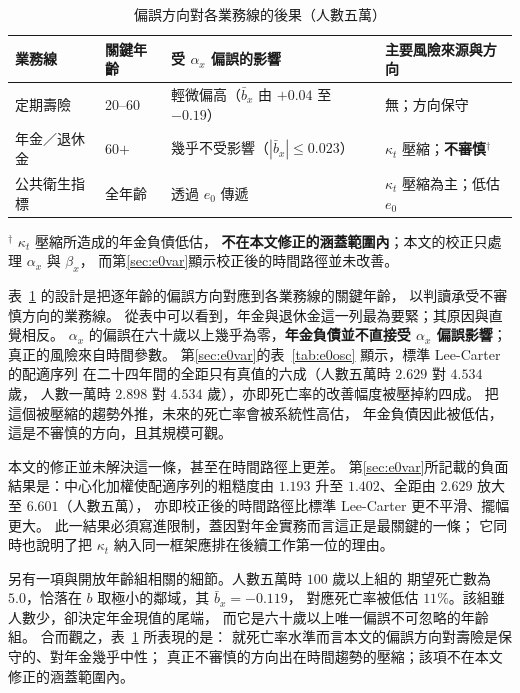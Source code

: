 \documentclass[UTF8, fontset=macnew, a4paper, 12pt]{ctexart}
\begin{document}
\begin{table}[H]
\centering
\caption{偏誤方向對各業務線的後果（人數五萬）}
\small
\begin{tabular}{llll}
\toprule
業務線 & 關鍵年齡 & 受 $\alpha_x$ 偏誤的影響 & 主要風險來源與方向\\
\midrule
定期壽險     & 20--60 & 輕微偏高（$\bar b_x$ 由 $+0.04$ 至 $-0.19$） & 無；方向保守\\
年金／退休金 & 60$+$  & 幾乎不受影響（$|\bar b_x|\le0.023$） & $\kappa_t$ 壓縮；\textbf{不審慎}$^{\dagger}$\\
公共衛生指標 & 全年齡 & 透過 $e_0$ 傳遞 & $\kappa_t$ 壓縮為主；低估 $e_0$\\
\bottomrule
\end{tabular}
\vspace{3pt}
{\footnotesize $^{\dagger}$ $\kappa_t$ 壓縮所造成的年金負債低估，
\textbf{不在本文修正的涵蓋範圍內}；本文的校正只處理 $\alpha_x$ 與 $\beta_x$，
而第\ref{sec:e0var}顯示校正後的時間路徑並未改善。}
\label{tab:risk}
\end{table}

表~\ref{tab:risk} 的設計是把逐年齡的偏誤方向對應到各業務線的關鍵年齡，
以判讀承受不審慎方向的業務線。
從表中可以看到，年金與退休金這一列最為要緊；其原因與直覺相反。
$\alpha_x$ 的偏誤在六十歲以上幾乎為零，\textbf{年金負債並不直接受
$\alpha_x$ 偏誤影響}；真正的風險來自時間參數。
第\ref{sec:e0var}的表~\ref{tab:e0osc} 顯示，標準 Lee-Carter 的配適序列
在二十四年間的全距只有真值的六成（人數五萬時 $2.629$ 對 $4.534$ 歲，
人數一萬時 $2.898$ 對 $4.534$ 歲），亦即死亡率的改善幅度被壓掉約四成。
把這個被壓縮的趨勢外推，未來的死亡率會被系統性高估，
年金負債因此被低估，這是不審慎的方向，且其規模可觀。

本文的修正並未解決這一條，甚至在時間路徑上更差。
第\ref{sec:e0var}所記載的負面結果是：中心化加權使配適序列的粗糙度由
$1.193$ 升至 $1.402$、全距由 $2.629$ 放大至 $6.601$（人數五萬），
亦即校正後的時間路徑比標準 Lee-Carter 更不平滑、擺幅更大。
此一結果必須寫進限制，蓋因對年金實務而言這正是最關鍵的一條；
它同時也說明了把 $\kappa_t$ 納入同一框架應排在後續工作第一位的理由。

另有一項與開放年齡組相關的細節。人數五萬時 $100$ 歲以上組的
期望死亡數為 $5.0$，恰落在 $b$ 取極小的鄰域，其 $\bar b_x=-0.119$，
對應死亡率被低估 $11\%$。該組雖人數少，卻決定年金現值的尾端，
而它是六十歲以上唯一偏誤不可忽略的年齡組。
合而觀之，表~\ref{tab:risk} 所表現的是：
就死亡率水準而言本文的偏誤方向對壽險是保守的、對年金幾乎中性；
真正不審慎的方向出在時間趨勢的壓縮；該項不在本文修正的涵蓋範圍內。
\end{document}
